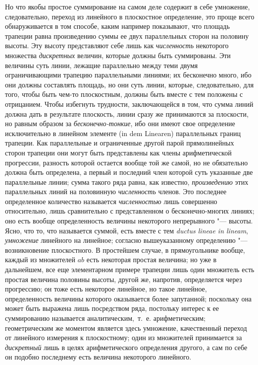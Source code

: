 {Но что якобы простое суммирование на самом деле содержит в себе умножение,
следовательно, переход из линейного в плоскостное определение, это проще
всего обнаруживается в том способе, каким например показывают, что площадь
трапеции равна произведению суммы ее двух параллельных сторон на половину
высоты. Эту высоту представляют себе лишь как
{\em численность} некоторого множества
{\em дискретных} величин, которые должны быть
суммированы. Эти величины суть линии, лежащие параллельно между теми двумя
ограничивающими трапецию параллельными линиями; их бесконечно много, ибо
они должны составлять площадь, но они суть линии, которые, следовательно,
для того, чтобы быть чем-то плоскостным, должны быть вместе с тем положены
с отрицанием. Чтобы избегнуть трудности, заключающейся в том, что сумма
линий должна дать в результате плоскость, линии сразу же принимаются за
плоскости, но равным образом за
{\em бесконечно-тонкие}, ибо они имеют свое определение
исключительно в линейном элементе (in dem Linearen) параллельных границ
трапеции. Как параллельные и ограниченные другой парой прямолинейных сторон
трапеции они могут быть представлены как члены арифметической прогрессии,
разность которой остается вообще той же самой, но не обязательно должна
быть определена, а первый и последний член которой суть указанные две
параллельные линии; сумма такого ряда равна, как известно,
{\em произведению} этих параллельных линий на
половинную {\em численность} членов. Это последнее
определенное количество называется {\em численностью}
лишь совершенно относительно, лишь сравнительно с представленном о
бесконечно-многих линиях; оно есть вообще определенность величины
некоторого {непрерывного} "--- высоты. Ясно, что то,
что называется суммой, есть вместе с тем {\em ductus
lineae in lineam}, {\em умножение} линейного на
линейное; согласно вышеуказанному определению "--- возникновение плоскостного.
В простейшем случае, в прямоугольнике вообще, каждый из множителей
$ab$ есть некоторая простая величина; но уже в
дальнейшем, все еще элементарном примере трапеции лишь один множитель есть
простая величина половины высоты, другой же, напротив, определяется через
прогрессию; он тоже есть некоторое линейное, но такое линейное,
определенность величины которого оказывается более запутанной; поскольку
она может быть выражена лишь посредством ряда, постольку интерес к ее
суммированию называется аналитическим,~т.~е. арифметическим; геометрическим
же моментом является здесь умножение, качественный переход от линейного
измерения к плоскостному; один из множителей принимается за
{\em дискретный} лишь в целях арифметического
определения другого, а сам по себе он подобно последнему есть величина
некоторого линейного.

}
